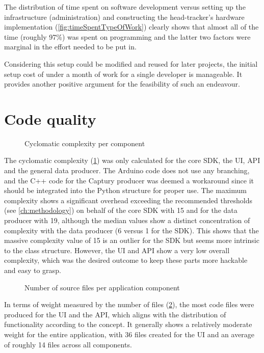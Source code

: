 The distribution of time spent on software development versus setting up the infrastructure (administration) and constructing the head-tracker's hardware implementation (\ref{fig:timeSpentTypeOfWork}) clearly shows that almost all of the time (roughly 97\%) was spent on programming and the latter two factors were marginal in the effort needed to be put in.

Considering this setup could be modified and reused for later projects, the initial setup cost of under a month of work for a single developer is manageable. It provides another positive argument for the feasibility of such an endeavour.

\section{Code quality}

\begin{figure}[h]
\centering

\caption[Cyclomatic complexity]{Cyclomatic complexity per component\protect}
\label{fig:cyclomaticComplexity}
\end{figure}

The cyclomatic complexity (\ref{fig:cyclomaticComplexity}) was only calculated for the core \ac{SDK}, the \ac{UI}, \ac{API} and the general data producer.
The Arduino code does not use any branching, and the C++ code for the Captury producer was deemed a workaround since it should be integrated into the Python structure for proper use.
The maximum complexity shows a significant overhead exceeding the recommended thresholds (see \autoref{ch:methodology}) on behalf of the core \ac{SDK} with 15 and for the data producer with 19, although the median values show a distinct concentration of complexity with the data producer (6 versus 1 for the \ac{SDK}).
This shows that the massive complexity value of 15 is an outlier for the \ac{SDK} but seems more intrinsic to the  class structure.
However, the \ac{UI} and \ac{API} show a very low overall complexity, which was the desired outcome to keep these parts more hackable and easy to grasp.

\begin{figure}[h]
\centering

\caption[File count]{Number of source files per application component\protect}
\label{fig:fileCount}
\end{figure}

In terms of weight measured by the number of files (\ref{fig:fileCount}), the most code files were produced for the \ac{UI} and the \ac{API}, which aligns with the distribution of functionality according to the concept. It generally shows a relatively moderate weight for the entire application, with 36 files created for the \ac{UI} and an average of roughly 14 files across all components.

